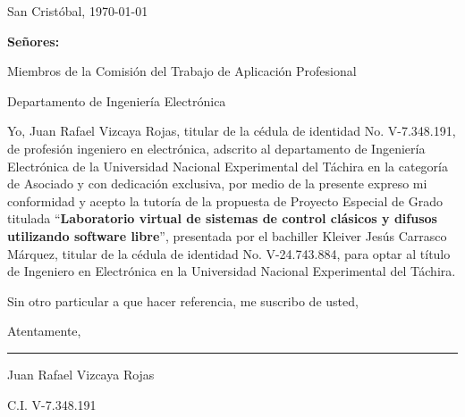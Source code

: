 \begin{titlepage}
\setcounter{page}{3}

\begin{flushright}
	San Cristóbal, \today
\end{flushright}

\vspace{1cm}
\vfill

\begin{flushleft}
		\singlespacing
		
		\setlength{\parskip}{0pt}
		
		\textbf{Señores:}
		
		Miembros de la Comisión del Trabajo de Aplicación Profesional
		
		Departamento de Ingeniería Electrónica
		
\end{flushleft}

\vfill
\begin{spacing}{1.5}
	Yo, Juan Rafael Vizcaya Rojas, titular de la cédula de identidad No. \mbox{V-7.348.191}, de profesión ingeniero en electrónica, adscrito al departamento de Ingeniería Electrónica de la Universidad Nacional Experimental del Táchira en la categoría de Asociado y con dedicación exclusiva, por medio de la presente expreso mi conformidad y acepto la tutoría de la propuesta de Proyecto Especial de Grado titulada \enquote{\textbf{Laboratorio virtual de sistemas de control clásicos y difusos utilizando software libre}}, presentada por el bachiller Kleiver Jesús Carrasco Márquez, titular de la cédula de identidad No. \mbox{V-24.743.884}, para optar al título de Ingeniero en Electrónica en la Universidad Nacional Experimental del Táchira.
	
	Sin otro particular a que hacer referencia, me suscribo de usted,
	
	\setlength{\parskip}{20pt} 
	
	\noindent Atentamente,
\end{spacing}

\vfill

\begin{center}
	
	\rule{6cm}{1pt}
	
	\vspace{0.2cm}
	
	Juan Rafael Vizcaya Rojas
	
	\setlength{\parskip}{0pt}
	
	C.I. V-7.348.191
\end{center}

\vspace{0.5cm}
\end{titlepage}
